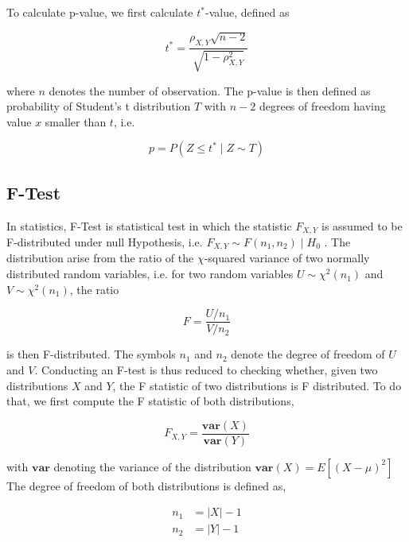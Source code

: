 \documentclass[pdftex,12pt,a4paper]{report}
\begin{document}
To calculate p-value, we  first calculate $t^*$-value, defined  as

\begin{equation}
t^* = \frac{\rho_{X,Y} \sqrt{n - 2}}{\sqrt{1 - \rho_{X,Y}^2}}
\end{equation}

where $n$ denotes the number of observation. The p-value is then defined as probability of Student's t distribution $T$ with $n - 2$ degrees of freedom having value $x$ smaller than $t$, i.e.

\begin{equation}
p = P(Z \leq t^* \mid Z \sim T)
\end{equation}

\subsection{F-Test}

In statistics, F-Test is statistical test in which the statistic $F_{X,Y} $ is assumed to be F-distributed under null Hypothesis, i.e. $F_{X,Y} \sim F(n_1, n_2) \mid  H_0$ \cite{fahrmeir2016statistik}. The distribution arise from the ratio of the $\chi$-squared variance of two normally distributed random variables, i.e. for two random variables $U \sim \chi^2(n_1)$  and $V \sim \chi^2(n_1)$, the ratio

\begin{equation}
F = \frac{U / n_1}{V / n_2}
\end{equation}

is then F-distributed. The symbols $n_1$ and $n_2$ denote the degree of freedom of $U$ and $V$. Conducting an F-test is thus reduced to checking whether, given two distributions $X$ and $Y$, the F statistic of two distributions is F distributed. To do that, we first compute the F statistic  of both distributions, 

\begin{equation}
F_{X,Y} = \frac{\mathbf{var}(X)}{\mathbf{var}(Y)}
\end{equation}

with $\mathbf{var}$ denoting the variance of the distribution $\mathbf{var}(X) = E[(X - \mu)^2]$
The degree of freedom of both distributions is defined as,

\begin{align}
  n_1 &= \vert X \vert - 1 \label{eq:ftest_dof_x} \\
  n_2 &= \vert Y \vert - 1\label{eq:ftest_dof_y}
\end{align}
\end{document}
